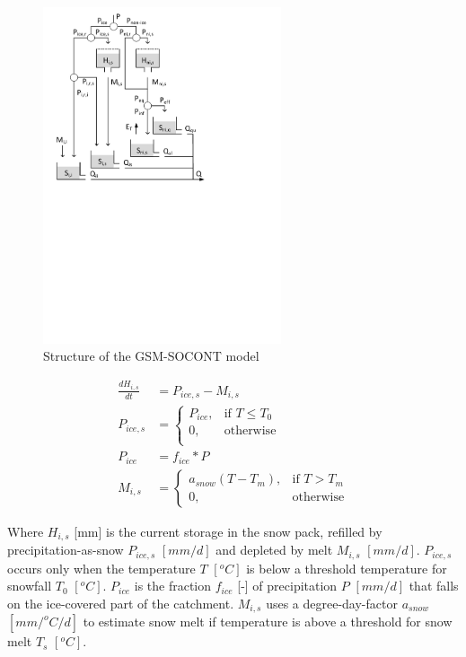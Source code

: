 { 																	%
\begin{figure}
\includegraphics[trim=1cm 14cm 7cm 1cm,width=7cm,keepaspectratio]{./AppA_files/43_schematic.pdf}
\caption{Structure of the GSM-SOCONT model} \label{fig:43_schematic}
\end{figure}

\begin{align}
	\frac{dH_{i,s}}{dt} &= P_{ice,s} - M_{i,s}\\
	P_{ice,s} &= \begin{cases}
		P_{ice}, &\text{if } T \leq T_0 \\
		0, & \text{otherwise} \\
	\end{cases} \\
	P_{ice} &= f_{ice}*P \\
	M_{i,s} &= \begin{cases}
		a_{snow}(T-T_m), &\text{if } T > T_m \\
		0, &\text{otherwise} 
	\end{cases} 
\end{align}

Where $H_{i,s}$ [mm] is the current storage in the snow pack, refilled by precipitation-as-snow $P_{ice,s}$ $[mm/d]$ and depleted by melt $M_{i,s}$ $[mm/d]$.
$P_{ice,s}$ occurs only when the temperature $T$ $[^oC]$ is below a threshold temperature for snowfall $T_0$ $[^oC]$.
$P_{ice}$ is the fraction $f_{ice}$ [-] of precipitation $P$ $[mm/d]$ that falls on the ice-covered part of the catchment.
$M_{i,s}$ uses a degree-day-factor $a_{snow}$ $[mm/^oC/d]$ to estimate snow melt if temperature is above a threshold for snow melt $T_s$ $[^oC]$.

} %

